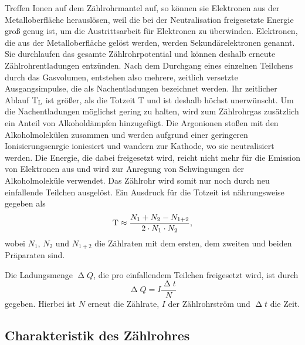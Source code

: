 Treffen Ionen auf dem Zählrohrmantel auf, so können sie Elektronen aus der Metalloberfläche herauslösen, weil die bei der Neutralisation freigesetzte Energie groß genug ist, um die Austrittsarbeit für Elektronen zu überwinden.
Elektronen, die aus der Metalloberfläche gelöst werden, werden Sekundärelektronen genannt. Sie durchlaufen das gesamte Zählrohrpotential und können deshalb erneute Zählrohrentladungen entzünden. Nach dem Durchgang eines einzelnen Teilchens 
durch das Gasvolumen, entstehen also mehrere, zeitlich versetzte Ausgangsimpulse, die als Nachentladungen bezeichnet werden. Ihr zeitlicher Ablauf $\text{T}_{\text L}$ ist größer, als die Totzeit T und ist deshalb höchst unerwünscht.
Um die Nachentladungen möglichst gering zu halten, wird zum Zählrohrgas zusätzlich ein Anteil von Alkoholdämpfen hinzugefügt. Die Argonionen stoßen mit den Alkoholmolekülen zusammen und werden aufgrund einer geringeren Ionisierungsenrgie ioniesiert und wandern zur Kathode, wo sie neutralisiert werden.
Die Energie, die dabei freigesetzt wird, reicht nicht mehr für die Emission von Elektronen aus und wird zur Anregung von Schwingungen der Alkoholmoleküle verwendet. Das Zählrohr wird somit nur noch durch neu einfallende Teilchen ausgelöst.
\newline
Ein Ausdruck für die Totzeit ist nährungsweise gegeben als
\begin{equation}
    \text T \approx \frac{N_1 + N_2 - N_\text{1+2}}{2 \cdot N_1 \cdot N_2},
    \label{eqn:tot}
\end{equation}
wobei $N_1$, $N_2$ und $N_{1+2}$ die Zählraten mit dem ersten, dem zweiten und beiden Präparaten sind.

Die Ladungsmenge $\upDelta Q$, die pro einfallendem Teilchen freigesetzt wird, ist durch
\begin{equation}
    \label{eqn:ener}
    \upDelta Q = I \frac{\upDelta t}{N}
  \end{equation} 
gegeben. Hierbei ist $N$ erneut die Zählrate, $I$ der Zählrohrström und $\upDelta t$ die Zeit.



\subsection{Charakteristik des Zählrohres}
\label{subsec:ZaehlrohrCharakteristik}

